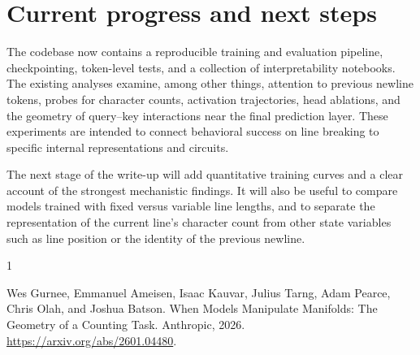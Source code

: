 \documentclass[11pt]{article}
\begin{document}
\section{Current progress and next steps}

The codebase now contains a reproducible training and evaluation pipeline,
checkpointing, token-level tests, and a collection of interpretability
notebooks.  The existing analyses examine, among other things, attention to
previous newline tokens, probes for character counts, activation trajectories,
head ablations, and the geometry of query--key interactions near the final
prediction layer.  These experiments are intended to connect behavioral
success on line breaking to specific internal representations and circuits.

The next stage of the write-up will add quantitative training curves and a
clear account of the strongest mechanistic findings.  It will also be useful
to compare models trained with fixed versus variable line lengths, and to
separate the representation of the current line's character count from other
state variables such as line position or the identity of the previous newline.

\begin{thebibliography}{1}

Wes Gurnee, Emmanuel Ameisen, Isaac Kauvar, Julius Tarng, Adam Pearce,
Chris Olah, and Joshua Batson.
\newblock When Models Manipulate Manifolds: The Geometry of a Counting Task.
\newblock Anthropic, 2026.
\newblock \url{https://arxiv.org/abs/2601.04480}.

\end{thebibliography}
\end{document}
